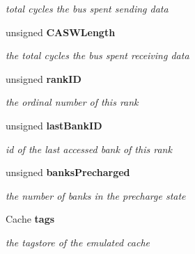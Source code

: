 \begin{DoxyCompactItemize}
\begin{DoxyCompactList}\small\item\em total cycles the bus spent sending data \item\end{DoxyCompactList}\item 
unsigned {\bf CASWLength}\label{class_d_r_a_msim_i_i_1_1_rank_ab86c1fae4862cef50536b50b5cc3723f}

\begin{DoxyCompactList}\small\item\em the total cycles the bus spent receiving data \item\end{DoxyCompactList}\item 
unsigned {\bf rankID}\label{class_d_r_a_msim_i_i_1_1_rank_affbf67886f2bc55eaf601710c63f5152}

\begin{DoxyCompactList}\small\item\em the ordinal number of this rank \item\end{DoxyCompactList}\item 
unsigned {\bf lastBankID}\label{class_d_r_a_msim_i_i_1_1_rank_a0180a5d1ab8f4ba541caa7409ab5b533}

\begin{DoxyCompactList}\small\item\em id of the last accessed bank of this rank \item\end{DoxyCompactList}\item 
unsigned {\bf banksPrecharged}\label{class_d_r_a_msim_i_i_1_1_rank_a86ddad92c9314e053da64c8d9ae89f46}

\begin{DoxyCompactList}\small\item\em the number of banks in the precharge state \item\end{DoxyCompactList}\item 
Cache {\bf tags}\label{class_d_r_a_msim_i_i_1_1_rank_a423960631a7c1abed12210724d89dc72}

\begin{DoxyCompactList}\small\item\em the tagstore of the emulated cache \item\end{DoxyCompactList}\end{DoxyCompactItemize}


